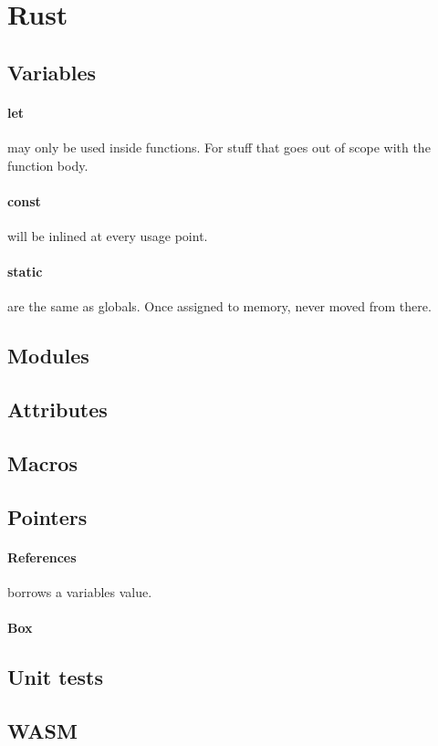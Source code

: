 \section{Rust}

\subsection{Variables}
\paragraph{let} may only be used inside functions. For stuff that goes out of scope with the function body.
\paragraph{const} will be inlined at every usage point.
\paragraph{static} are the same as globals. Once assigned to memory, never moved from there. 

\subsection{Modules}

\subsection{Attributes}

\subsection{Macros}

\subsection{Pointers}
\paragraph{References} \inlinecode{&} borrows a variables value.
\paragraph{Box}

\subsection{Unit tests}

\subsection{WASM}